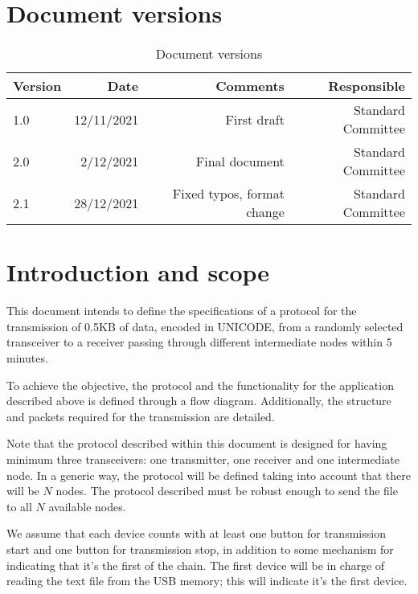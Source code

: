 \chapter{Document versions}

\vspace{0.5cm}
\begin{table}[H]
	\centering
	\begin{tabular}{|l|r|r|r|} \hline
	Version & Date & Comments & Responsible \\ \hline \hline
	1.0 & 12/11/2021 & First draft & Standard Committee \\ \hline
	2.0 & 2/12/2021 & Final document & Standard Committee \\ \hline
	2.1 & 28/12/2021 & Fixed typos, format change & Standard Committee \\ \hline
	\end{tabular}
	\caption{Document versions}
	\label{tab:label}
\end{table}


\chapter{Introduction and scope}

This document intends to define the specifications of a protocol for the transmission of 0.5KB of data, encoded in UNICODE, from a randomly selected transceiver to a receiver passing through different intermediate nodes within 5 minutes.

To achieve the objective, the protocol and the functionality for the application described above is defined through a flow diagram. Additionally, the structure and packets required for the transmission are detailed.

Note that the protocol described within this document is designed for having minimum three transceivers: one transmitter, one receiver and one intermediate node. In a generic way, the protocol will be defined taking into account that there will be $N$ nodes. The protocol described must be robust enough to send the file to all $N$ available nodes.

We assume that each device counts with at least one button for transmission start and one button for transmission stop, in addition to some mechanism for indicating that it’s the first of the chain. The first device will be in charge of reading the text file from the USB memory; this will indicate it’s the first device.






